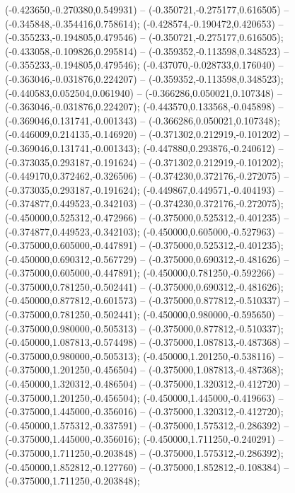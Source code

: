  (-0.423650,-0.270380,0.549931) -- (-0.350721,-0.275177,0.616505) -- (-0.345848,-0.354416,0.758614);
 (-0.428574,-0.190472,0.420653) -- (-0.355233,-0.194805,0.479546) -- (-0.350721,-0.275177,0.616505);
 (-0.433058,-0.109826,0.295814) -- (-0.359352,-0.113598,0.348523) -- (-0.355233,-0.194805,0.479546);
 (-0.437070,-0.028733,0.176040) -- (-0.363046,-0.031876,0.224207) -- (-0.359352,-0.113598,0.348523);
 (-0.440583,0.052504,0.061940) -- (-0.366286,0.050021,0.107348) -- (-0.363046,-0.031876,0.224207);
 (-0.443570,0.133568,-0.045898) -- (-0.369046,0.131741,-0.001343) -- (-0.366286,0.050021,0.107348);
 (-0.446009,0.214135,-0.146920) -- (-0.371302,0.212919,-0.101202) -- (-0.369046,0.131741,-0.001343);
 (-0.447880,0.293876,-0.240612) -- (-0.373035,0.293187,-0.191624) -- (-0.371302,0.212919,-0.101202);
 (-0.449170,0.372462,-0.326506) -- (-0.374230,0.372176,-0.272075) -- (-0.373035,0.293187,-0.191624);
 (-0.449867,0.449571,-0.404193) -- (-0.374877,0.449523,-0.342103) -- (-0.374230,0.372176,-0.272075);
 (-0.450000,0.525312,-0.472966) -- (-0.375000,0.525312,-0.401235) -- (-0.374877,0.449523,-0.342103);
 (-0.450000,0.605000,-0.527963) -- (-0.375000,0.605000,-0.447891) -- (-0.375000,0.525312,-0.401235);
 (-0.450000,0.690312,-0.567729) -- (-0.375000,0.690312,-0.481626) -- (-0.375000,0.605000,-0.447891);
 (-0.450000,0.781250,-0.592266) -- (-0.375000,0.781250,-0.502441) -- (-0.375000,0.690312,-0.481626);
 (-0.450000,0.877812,-0.601573) -- (-0.375000,0.877812,-0.510337) -- (-0.375000,0.781250,-0.502441);
 (-0.450000,0.980000,-0.595650) -- (-0.375000,0.980000,-0.505313) -- (-0.375000,0.877812,-0.510337);
 (-0.450000,1.087813,-0.574498) -- (-0.375000,1.087813,-0.487368) -- (-0.375000,0.980000,-0.505313);
 (-0.450000,1.201250,-0.538116) -- (-0.375000,1.201250,-0.456504) -- (-0.375000,1.087813,-0.487368);
 (-0.450000,1.320312,-0.486504) -- (-0.375000,1.320312,-0.412720) -- (-0.375000,1.201250,-0.456504);
 (-0.450000,1.445000,-0.419663) -- (-0.375000,1.445000,-0.356016) -- (-0.375000,1.320312,-0.412720);
 (-0.450000,1.575312,-0.337591) -- (-0.375000,1.575312,-0.286392) -- (-0.375000,1.445000,-0.356016);
 (-0.450000,1.711250,-0.240291) -- (-0.375000,1.711250,-0.203848) -- (-0.375000,1.575312,-0.286392);
 (-0.450000,1.852812,-0.127760) -- (-0.375000,1.852812,-0.108384) -- (-0.375000,1.711250,-0.203848);
